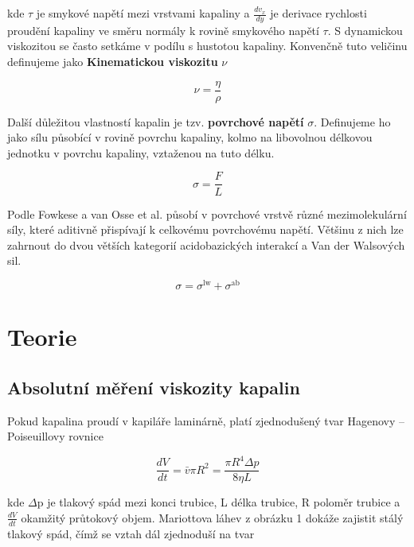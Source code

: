 \documentclass[a4paper,11pt]{article}
\begin{document}
kde $\tau$ je smykové napětí mezi vrstvami kapaliny a  $\frac{dv_x}{dy}$ je derivace rychlosti proudění kapaliny ve
směru normály k rovině smykového napětí $\tau$. S dynamickou viskozitou se často setkáme v podílu s hustotou kapaliny. Konvenčně tuto veličinu definujeme jako \textbf{Kinematickou viskozitu} $\nu$

\begin{equation}
\nu = \frac{\eta}{\rho}
\end{equation}

Další důležitou vlastností kapalin je tzv. \textbf{povrchové napětí} $\sigma$. Definujeme ho jako sílu působící v rovině povrchu kapaliny, kolmo na libovolnou délkovou jednotku v povrchu kapaliny, vztaženou na tuto délku.

\begin{equation}
  \sigma = \frac{F}{L}
\end{equation}

Podle Fowkese a van Osse et al. působí v povrchové vrstvě různé mezimolekulární síly, které aditivně přispívají k celkovému povrchovému napětí. Většinu z nich lze zahrnout do dvou větších kategorií acidobazických interakcí a Van der Walsových sil.

\begin{equation}
  \sigma = \sigma^{\text{lw}} + \sigma^{\text{ab}}
\end{equation}

\newpage

\section{Teorie}

\subsection{Absolutní měření viskozity kapalin}

Pokud kapalina proudí v kapiláře laminárně, platí zjednodušený tvar Hagenovy – Poiseuillovy rovnice

\begin{equation}
\frac{dV}{dt} =  \bar{v} \pi R^2 = \frac{\pi R^4 \Delta p }{8 \eta L} 
\end{equation}

\noindent
kde $\Delta$p je tlakový spád mezi konci trubice, L délka trubice, R poloměr trubice a $\frac{dV}{dt}$ okamžitý průtokový objem. Mariottova láhev z obrázku 1 dokáže zajistit stálý tlakový spád, čímž se vztah dál zjednoduší na tvar
\end{document}
